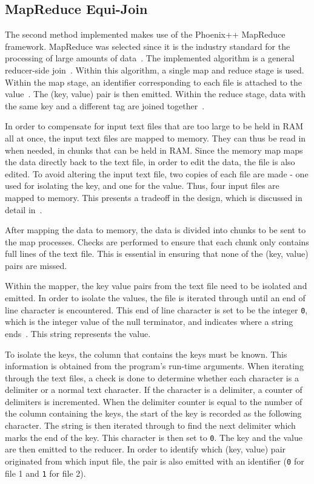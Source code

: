 \documentclass[11pt,twocolumn]{witseiepaper}
\begin{document}
\subsection{MapReduce Equi-Join}
The second method implemented makes use of the Phoenix++ MapReduce framework. MapReduce was selected since it is the industry standard for the processing of large amounts of data~\cite{comparingMPIMapReduce}. The implemented algorithm is a general reducer-side join~\cite{mapReduceJoin}. Within this algorithm, a single map and reduce stage is used. Within the map stage, an identifier corresponding to each file is attached to the value~\cite{mapReduceJoin}. The (key, value) pair is then emitted. Within the reduce stage, data with the same key and a different tag are joined together~\cite{mapReduceJoin}.

In order to compensate for input text files that are too large to be held in RAM all at once, the input text files are mapped to memory. They can thus be read in when needed, in chunks that can be held in RAM. Since the memory map maps the data directly back to the text file, in order to edit the data, the file is also edited. To avoid altering the input text file, two copies of each file are made - one used for isolating the key, and one for the value. Thus, four input files are mapped to memory. This presents a tradeoff in the design, which is discussed in detail in~.

After mapping the data to memory, the data is divided into chunks to be sent to the map processes. Checks are performed to ensure that each chunk only contains full lines of the text file. This is essential in ensuring that none of the (key, value) pairs are missed.

Within the mapper, the key value pairs from the text file need to be isolated and emitted. In order to isolate the values, the file is iterated through until an end of line character is encountered. This end of line character is set to be the integer \texttt{0}, which is the integer value of the null terminator, and indicates where a string ends~\cite{phoenix}. This string represents the value.

To isolate the keys, the column that contains the keys must be known. This information is obtained from the program's run-time arguments. When iterating through the text files, a check is done to determine whether each character is a delimiter or a normal text character. If the character is a delimiter, a counter of delimiters is incremented. When the delimiter counter is equal to the number of the column containing the keys, the start of the key is recorded as the following character. The string is then iterated through to find the next delimiter which marks the end of the key. This character is then set to \texttt{0}. The key and the value are then emitted to the reducer. In order to identify which (key, value) pair originated from which input file, the pair is also emitted with an identifier (\texttt{0} for file 1 and \texttt{1} for file 2).
\end{document}
